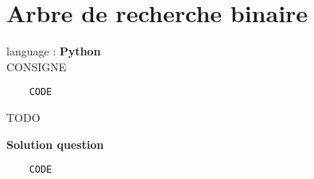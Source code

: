 \newpage
\section{Arbre de recherche binaire}

\begin{Exercice}[0 minutes] language : \textbf{Python}\\
    
    CONSIGNE

    \begin{verbatim}
    CODE
    \end{verbatim}

    \begin{conseil}
    TODO
    \end{conseil}

\textbf{Solution question }

    \begin{verbatim}
    CODE
    \end{verbatim}

\end{Exercice}



